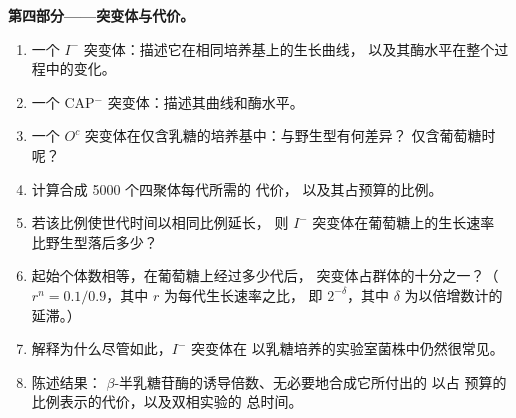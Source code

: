 \begin{problem}
\medskip
\noindent\textbf{第四部分——突变体与代价。}
\begin{enumerate}[resume]
  \item 一个 $I^-$ 突变体：描述它在相同培养基上的生长曲线，
        以及其酶水平在整个过程中的变化。
  \item 一个 CAP$^-$ 突变体：描述其曲线和酶水平。
  \item 一个 $O^c$ 突变体在仅含乳糖的培养基中：与野生型有何差异？
        仅含葡萄糖时呢？
  \item 计算合成 \num{5000} 个四聚体每代所需的  代价，
        以及其占预算的比例。
  \item 若该比例使世代时间以相同比例延长，
        则 $I^-$ 突变体在葡萄糖上的生长速率
        比野生型落后多少？
  \item 起始个体数相等，在葡萄糖上经过多少代后，
        突变体占群体的十分之一？（$r^n =
        0.1/0.9$，其中 $r$ 为每代生长速率之比，
        即 $2^{-\delta}$，其中 $\delta$ 为以倍增数计的延滞。）
  \item 解释为什么尽管如此，$I^-$ 突变体在
        以乳糖培养的实验室菌株中仍然很常见。
  \item 陈述结果：
        $\beta$-半乳糖苷酶的诱导倍数、无必要地合成它所付出的
        以占  预算的比例表示的代价，以及双相实验的
        总时间。
\end{enumerate}
\end{problem}

